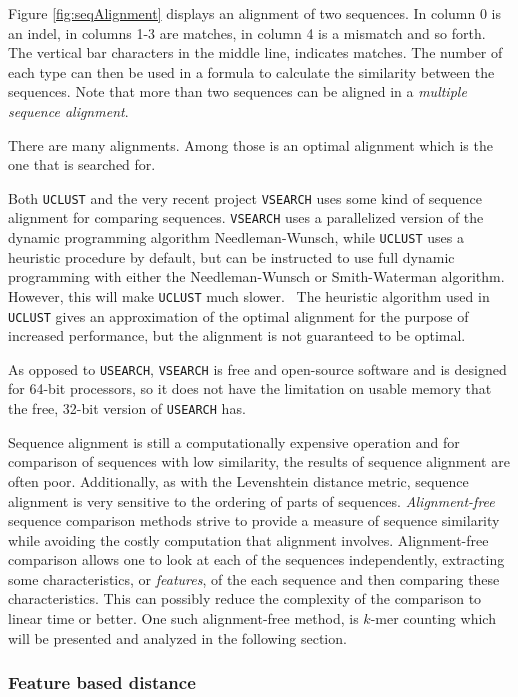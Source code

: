 Figure \ref{fig:seqAlignment} displays an alignment of two sequences. In column
0 is an indel, in columns 1-3 are matches, in column 4 is a mismatch and so
forth. The vertical bar characters in the middle line, indicates matches. The
number of each type can then be used in a formula to calculate the similarity
between the sequences. Note that more than two sequences can be aligned in a
\emph{multiple sequence alignment}.

There are many alignments. Among those is an optimal alignment which is the one
that is searched for.

Both \texttt{UCLUST} and the very recent project \texttt{VSEARCH} uses some
kind of sequence alignment for comparing sequences. \texttt{VSEARCH} uses a
parallelized version of the dynamic programming algorithm Needleman-Wunsch,
while \texttt{UCLUST} uses a heuristic procedure by default, but can be
instructed to use full dynamic programming with either the Needleman-Wunsch or
Smith-Waterman algorithm. However, this will make \texttt{UCLUST} much
slower.~\cite{vsearch} The heuristic algorithm used in \texttt{UCLUST} gives an
approximation of the optimal alignment for the purpose of increased
performance, but the alignment is not guaranteed to be optimal.

As opposed to \texttt{USEARCH}, \texttt{VSEARCH} is free and open-source
software and is designed for 64-bit processors, so it does not have the
limitation on usable memory that the free, 32-bit version of \texttt{USEARCH}
has.

Sequence alignment is still a computationally expensive operation and for
comparison of sequences with low similarity, the results of sequence alignment
are often poor. Additionally, as with the Levenshtein distance metric, sequence
alignment is very sensitive to the ordering of parts of sequences.
\emph{Alignment-free} sequence comparison methods strive to provide a measure
of sequence similarity while avoiding the costly computation that alignment
involves. Alignment-free comparison allows one to look at each of the sequences
independently, extracting some characteristics, or \emph{features}, of the each
sequence and then comparing these characteristics.  This can possibly reduce
the complexity of the comparison to linear time or better. One such
alignment-free method, is $k$-mer counting which will be presented and analyzed
in the following section.


\subsubsection{Feature based distance}

